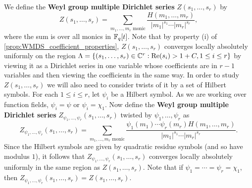 \documentclass[12pt,reqno,oneside]{amsart}
\begin{document}
    We define the \textbf{Weyl group multiple Dirichlet series} $Z(s_{1},\ldots,s_{r})$ by
    \[
        Z(s_{1},\ldots,s_{r}) = \sum_{\text{$m_{1},\ldots,m_{r}$ monic}}\frac{H(m_{1},\ldots,m_{r})}{|m_{1}|^{s_{1}} \cdots |m_{r}|^{s_{r}}},
    \]
    where the sum is over all monics in $\mathbb{F}_{q}[t]$. Note that by property (i) of \cref{prop:WMDS_coefficient_properties}, $Z(s_{1},\ldots,s_{r})$ converges locally absolutely uniformly on the region $\Lambda = \{(s_{1},\ldots,s_{r}) \in \mathbb{C}^{r}:\mathrm{Re}(s_{i}) > 1+C, 1 \le i \le r\}$ by viewing it as a Dirichlet series in one variable whose coefficients are in $r-1$ variables and then viewing the coefficients in the same way. In order to study $Z(s_{1},\ldots,s_{r})$ we will also need to consider twists of it by a set of Hilbert symbols. For each $1 \le i \le r$, let $\psi_{i}$ be a Hilbert symbol. As we are working over function fields, $\psi_{i} = \psi$ or $\psi_{i} = \chi_{1}$. Now define the \textbf{Weyl group multiple Dirichlet series} $Z_{\psi_{1},\ldots,\psi_{r}}(s_{1},\ldots,s_{r})$ twisted by $\psi_{1},\ldots,\psi_{r}$ as
    \[
        Z_{\psi_{1},\ldots,\psi_{r}}(s_{1},\ldots,s_{r}) = \sum_{\text{$m_{1},\ldots,m_{r}$ monic}}\frac{\psi_{1}(m_{1}) \cdots \psi_{r}(m_{r})H(m_{1},\ldots,m_{r})}{|m_{1}|^{s_{1}} \cdots |m_{r}|^{s_{r}}}.
    \]
    Since the Hilbert symbols are given by quadratic residue symbols (and so have modulus $1$), it follows that $Z_{\psi_{1},\ldots,\psi_{r}}(s_{1},\ldots,s_{r})$ converges locally absolutely uniformly in the same region as $Z(s_{1},\ldots,s_{r})$. Note that if $\psi_{1} = \cdots = \psi_{r} = \chi_{1}$, then $Z_{\psi_{1},\ldots,\psi_{r}}(s_{1},\ldots,s_{r}) = Z(s_{1},\ldots,s_{r})$.
\end{document}
